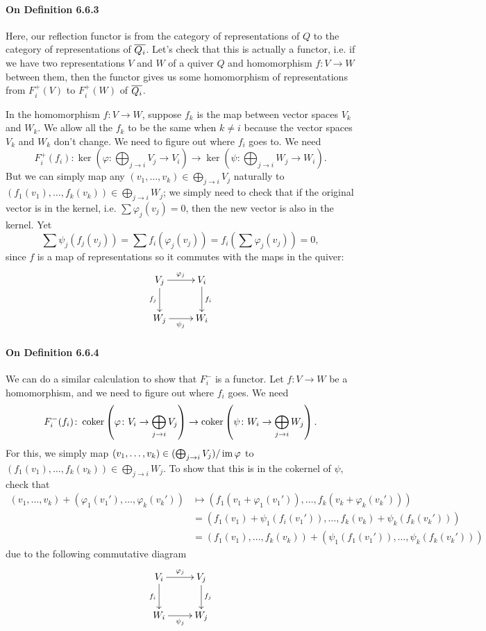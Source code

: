 \documentclass[oneside]{scrbook}
\begin{document}
\paragraph{On Definition 6.6.3} Here, our reflection functor is from the category of representations of $Q$ to the category of representations of $\overline{Q_i}$. Let's check that this is actually a functor, i.e. if we have two representations $V$ and $W$ of a quiver $Q$ and homomorphism $f:V\to W$ between them, then the functor gives us some homomorphism of representations from $F_i^+(V)$ to $F_i^+(W)$ of $\overline{Q_i}$.

In the homomorphism $f:V\to W$, suppose $f_k$ is the map between vector spaces $V_k$ and $W_k$. We allow all the $f_k$ to be the same when $k\neq i$ because the vector spaces $V_k$ and $W_k$ don't change. We need to figure out where $f_i$ goes to. We need
\[F_i^+(f_i):\ker\left(\varphi:\bigoplus_{j\to i}V_j\to V_i\right)\to \ker\left(\psi:\bigoplus_{j\to i}W_j\to W_i\right).\]
But we can simply map any $(v_1,\dots, v_k)\in \bigoplus_{j\to i}V_j$ naturally to $(f_1(v_1),\dots,f_k(v_k))\in \bigoplus_{j\to i}W_j$; we simply need to check that if the original vector is in the kernel, i.e. $\sum \varphi_j(v_j)=0$, then the new vector is also in the kernel. Yet
\[\sum \psi_j(f_j(v_j))=\sum f_i(\varphi_j(v_j))=f_i\left(\sum \varphi_j(v_j) \right)=0,\]
since $f$ is a map of representations so it commutes with the maps in the quiver:
\[\xymatrix{
V_j \ar[r]^{\varphi_j} \ar[d]_{f_j} & V_i \ar[d]^{f_i}\\
W_j \ar[r]_{\psi_j} & W_i}\]

\paragraph{On Definition 6.6.4}
We can do a similar calculation to show that $F_i^{-}$ is a functor. Let $f\colon V\to W$ be a homomorphism, and we need to figure out where $f_i$ goes. We need
\[F_i^{-}(f_i)\colon \operatorname{coker}\left(\varphi\colon V_i\to \bigoplus_{j\to i}V_j\right)\to\operatorname{coker}\left(\psi\colon W_i\to \bigoplus_{j\to i}W_j\right).\]
For this, we simply map $(v_1,\ldots,v_k)\in (\bigoplus_{j\to i}V_j)/\operatorname{im} \varphi$ to $(f_1(v_1),\ldots,f_k(v_k))\in \bigoplus_{j\to i}W_j$. To show that this is in the cokernel of $\psi$, check that
\begin{align*}
(v_1,\ldots,v_k)+(\varphi_1(v_1'),\ldots,\varphi_k(v_k')) &\mapsto (f_1(v_1+\varphi_1(v_1')),\ldots,f_k(v_k+\varphi_k(v_k')))\\
&= (f_1(v_1)+\psi_1(f_i(v_1')),\ldots,f_k(v_k)+\psi_k(f_k(v_k')))\\
&= (f_1(v_1),\ldots,f_k(v_k))+(\psi_1(f_1(v_1')),\ldots,\psi_k(f_k(v_k')))
\end{align*}
due to the following commutative diagram
\[\xymatrix{
V_i \ar[r]^{\varphi_j} \ar[d]_{f_i} & V_j \ar[d]^{f_j}\\
W_i \ar[r]_{\psi_j} & W_j}\]
\end{document}
